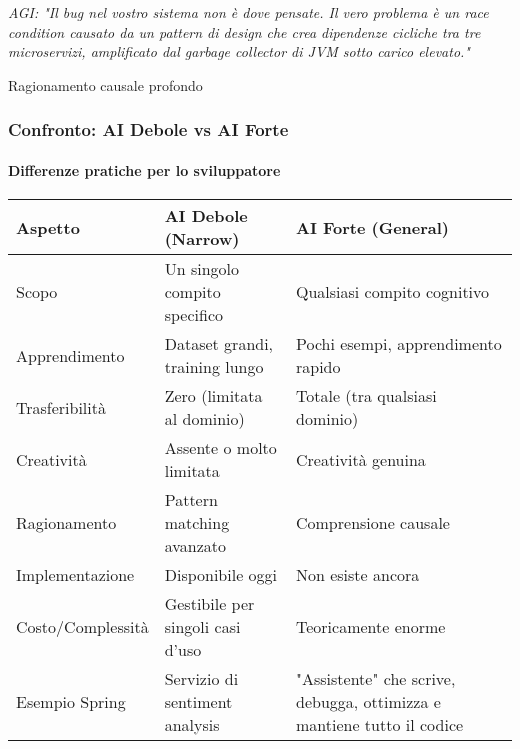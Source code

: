\begin{frame}[t,fragile]
{{\begin{minipage}[t]{\textwidth}
\begin{minipage}[t]{0.6\textwidth}
				\setlength{\epigraphwidth}{0.9\textwidth}
				\epigraph{\textit{AGI: "Il bug nel vostro sistema non è dove pensate. Il vero problema è un race condition causato da un pattern di design che crea dipendenze cicliche tra tre microservizi, amplificato dal garbage collector di JVM sotto carico elevato."}}{Ragionamento causale profondo}
			\end{minipage}
			\begin{minipage}[t]{0.35\textwidth}
				\centering
			\end{minipage}
		\end{minipage}
		}
	}
\end{frame}
%
\begin{frame}[t,fragile] \frametitle{Confronto: AI Debole vs AI Forte}
	{\small
		\framesubtitle{Differenze pratiche per lo sviluppatore}
		\vspace*{-.5cm}
		\begin{center}
		{\scriptsize
		\begin{table}
			\setlength{\tabcolsep}{8pt}
			\renewcommand{\arraystretch}{1.5}
			\centering
			\begin{tabular}{p{2.5cm}p{4cm}p{4cm}}
				\toprule
				\textbf{Aspetto} & \textbf{AI Debole (Narrow)} & \textbf{AI Forte (General)}\\
				\midrule
				\alert{Scopo} & Un singolo compito specifico & Qualsiasi compito cognitivo\\
				\alert{Apprendimento} & Dataset grandi, training lungo & Pochi esempi, apprendimento rapido\\
				\alert{Trasferibilità} & Zero (limitata al dominio) & Totale (tra qualsiasi dominio)\\
				\alert{Creatività} & Assente o molto limitata & Creatività genuina\\
				\alert{Ragionamento} & Pattern matching avanzato & Comprensione causale\\
				\alert{Implementazione} & Disponibile oggi & Non esiste ancora\\
				\alert{Costo/Complessità} & Gestibile per singoli casi d'uso & Teoricamente enorme\\
				\alert{Esempio Spring} & Servizio di sentiment analysis & "Assistente" che scrive, debugga, ottimizza e mantiene tutto il codice\\
				\bottomrule
			\end{tabular}
		\end{table}
		}
		\end{center}
	}
\end{frame}
